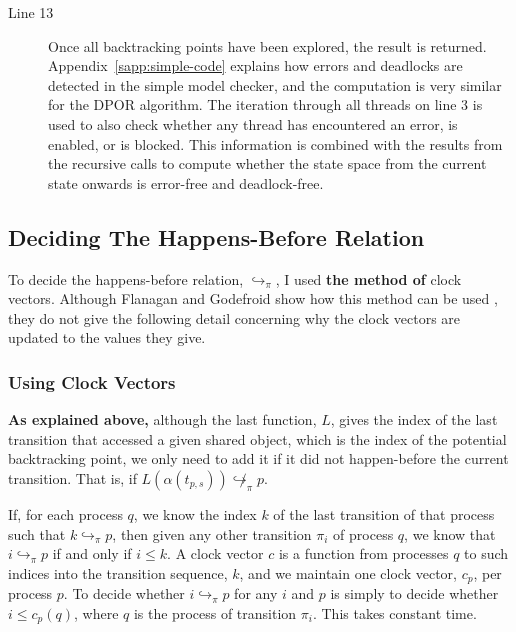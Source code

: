 \documentclass[12pt,a4paper,twoside,openright]{report}
\begin{document}
\begin{description}
	\item[Line 13] Once all backtracking points have been
	explored, the result is returned.
	Appendix~\ref{sapp:simple-code} explains
	how errors and deadlocks are
	detected in the simple model checker,
	and the computation is very similar
	for the DPOR algorithm. The iteration
	through all threads on line 3 is used
	to also check whether any thread has
	encountered an error, is enabled,
	or is blocked.
	This information is combined with the
	results from the recursive calls to
	compute whether the state space from
	the current state onwards is error-free
	and deadlock-free.

\end{description}

\subsection{Deciding The Happens-Before Relation}
\label{sec:clock-vectors}

To decide the happens-before relation,
$\hookrightarrow_\pi$, I used \textbf{the method
of }clock vectors. Although Flanagan
and Godefroid show how this method
can be used \cite{flan05},
they do not give the
following detail concerning why
the clock vectors are updated to
the values they give.

\subsubsection{Using Clock Vectors}

\textbf{As explained above,} although
the last function, $L$, gives the index
of the last transition that accessed a given shared
object, which is the index of the potential backtracking
point, we only need to add it if it
did not happen-before the current transition.
That is, if
$L(\alpha(t_{p,s})) \not\hookrightarrow_\pi p$.

If, for each process
$q$, we know the index $k$ of the last transition of that
process such that $k \hookrightarrow_\pi p$,
then given any other transition $\pi_i$ of
process $q$, we know that
$i \hookrightarrow_\pi p$ if and only if
$i \leq k$. A clock vector $c$ is
a function from processes $q$ to such
indices into the transition sequence, $k$,
and we maintain one clock vector, $c_p$, per
process $p$. To decide whether
$i \hookrightarrow_\pi p$ for
any $i$ and $p$ is simply to decide
whether $i \leq c_p(q)$, where $q$ is
the process of transition $\pi_i$.
This takes constant time.
\end{document}
